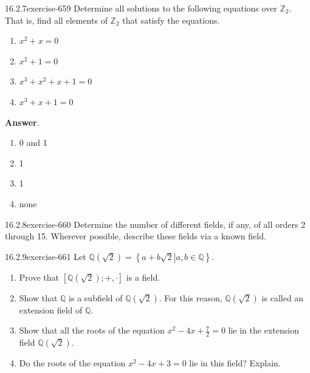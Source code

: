 \documentclass[twoside,10pt,]{book}
\numberwithin{equation}{section}
\begin{document}
\begin{divisionsolution}{16.2.7}{}{exercise-659}%
\hypertarget{p-5904}{}%
Determine all solutions to the following equations over \(\mathbb{Z}_2\). That is, find all elements of \(\mathbb{Z}_2\) that satisfy the equations.\leavevmode%
\begin{multicols}{2}
\begin{enumerate}[label=(\alph*)]
\item\hypertarget{li-2610}{}\hypertarget{p-5905}{}%
\(x^2 + x = 0\)%
\item\hypertarget{li-2611}{}\hypertarget{p-5906}{}%
\(x^2 + 1 = 0\)%
\item\hypertarget{li-2612}{}\hypertarget{p-5907}{}%
\(x^3 + x^2 + x + 1 = 0\)%
\item\hypertarget{li-2613}{}\hypertarget{p-5908}{}%
\(x^3 + x + 1 = 0\)%
\end{enumerate}
\end{multicols}
%
\par\smallskip%
\noindent\textbf{Answer}.\quad%
\hypertarget{p-5909}{}%
\leavevmode%
\begin{multicols}{4}
\begin{enumerate}[label=(\alph*)]
\item\hypertarget{li-2614}{}\hypertarget{p-5910}{}%
0 and 1%
\item\hypertarget{li-2615}{}\hypertarget{p-5911}{}%
1%
\item\hypertarget{li-2616}{}\hypertarget{p-5912}{}%
1%
\item\hypertarget{li-2617}{}\hypertarget{p-5913}{}%
none%
\end{enumerate}
\end{multicols}
%
\end{divisionsolution}%
\begin{divisionsolution}{16.2.8}{}{exercise-660}%
\hypertarget{p-5914}{}%
Determine the number of different fields, if any, of all orders 2 through 15. Wherever possible, describe these fields via a known field.%
\end{divisionsolution}%
\begin{divisionsolution}{16.2.9}{}{exercise-661}%
\hypertarget{p-5915}{}%
Let \(\mathbb{Q}\left(\sqrt{2}\right) = \left\{\left.a + b\sqrt{2}\right| a, b \in  \mathbb{Q}\right\}\).\leavevmode%
\begin{enumerate}[label=(\alph*)]
\item\hypertarget{li-2618}{}\hypertarget{p-5916}{}%
Prove that \(\left[\mathbb{Q}\left(\sqrt{2}\right); +, \cdot \right]\) is a field.%
\item\hypertarget{li-2619}{}\hypertarget{p-5917}{}%
Show that \(\mathbb{Q}\) is a subfield of \(\mathbb{Q}\left(\sqrt{2}\right)\). For this reason, \(\mathbb{Q}\left(\sqrt{2}\right)\) is called an extension field of \(\mathbb{Q}\).%
\item\hypertarget{li-2620}{}\hypertarget{p-5918}{}%
Show that all the roots of the equation \(x^2 - 4x+\frac{7}{2} = 0\) lie in the extension field \(\mathbb{Q}\left(\sqrt{2}\right)\).%
\item\hypertarget{li-2621}{}\hypertarget{p-5919}{}%
Do the roots of the equation \(x^2 -4 x+ 3 = 0\) lie in this field? Explain.%
\end{enumerate}
%
\end{divisionsolution}%
\end{document}
